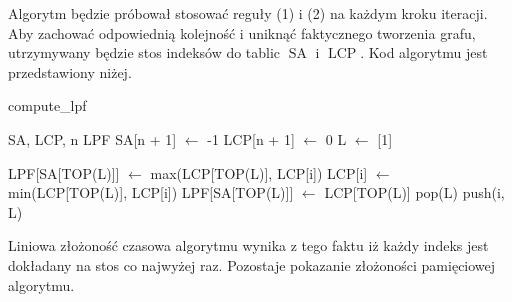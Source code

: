 \documentclass[a4paper,12pt]{article}
\theoremstyle{definition}
\DeclareMathOperator{\SA}{SA}
\DeclareMathOperator{\LCP}{LCP}
\begin{document}
Algorytm będzie próbował stosować reguły (1) i (2) na każdym kroku iteracji.
Aby zachować odpowiednią kolejność i uniknąć faktycznego tworzenia grafu,
 utrzymywany będzie stos indeksów do tablic $\SA$ i $\LCP$.
Kod algorytmu jest przedstawiony niżej.

\begin{algorithm}
\caption{compute\_lpf}
\begin{algorithmic}
\REQUIRE SA, LCP, n
\ENSURE LPF
\STATE SA[n + 1] $\gets$ -1
\STATE LCP[n + 1] $\gets$ 0
\STATE L $\gets$ [1]

\STATE LPF[SA[TOP(L)]] $\gets$ max(LCP[TOP(L)], LCP[i])
\STATE LCP[i] $\gets$ min(LCP[TOP(L)], LCP[i])
\ELSE
\STATE LPF[SA[TOP(L)]] $\gets$ LCP[TOP(L)]
\ENDIF
\STATE pop(L)
\ENDWHILE
{}
\STATE push(i, L)
\ENDIF
\ENDFOR
\end{algorithmic}
\end{algorithm}

Liniowa złożoność czasowa algorytmu wynika z tego faktu iż każdy indeks jest dokładany na stos co najwyżej raz.
Pozostaje pokazanie złożoności pamięciowej algorytmu.
\end{document}
